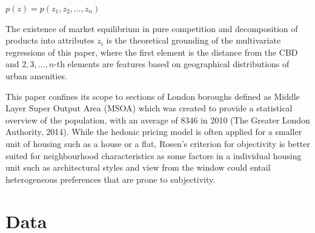 \documentclass{article}
\begin{document}
\begin{center}
    $p ( z ) = p \left( z _ { 1 } , z _ { 2 } , \dots , z _ { n } \right)$
\end{center}

The existence of market equilibrium in pure competition and decomposition of products into attributes $z_i$ is the theoretical grounding of the multivariate regressions of this paper, where the first element is the distance from the CBD and $2, 3, ..., n$-th elements are features based on geographical distributions of urban amenities.

This paper confines its scope to sections of London boroughs defined as Middle Layer Super Output Area (MSOA) which was created to provide a statistical overview of the population, with an average of 8346 in 2010 (The Greater London Authority, 2014). While the hedonic pricing model is often applied for a smaller unit of housing such as a house or a flat, Rosen's criterion for objectivity is better suited for neighbourhood characteristics as some factors in a individual housing unit such as architectural styles and view from the window could entail heterogeneous preferences that are prone to subjectivity.


\section{Data}
\end{document}
